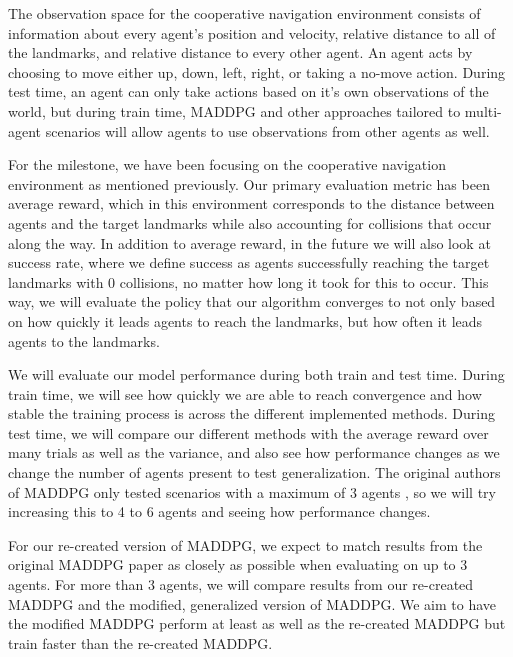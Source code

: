 \documentclass{article}
\begin{document}
The observation space for the cooperative navigation environment consists of information about every agent's position and velocity, relative distance to all of the landmarks, and relative distance to every other agent. An agent acts by choosing to move either up, down, left, right, or taking a no-move action. During test time, an agent can only take actions based on it's own observations of the world, but during train time, MADDPG and other approaches tailored to multi-agent scenarios will allow agents to use observations from other agents as well.

For the milestone, we have been focusing on the cooperative navigation environment as mentioned previously. Our primary evaluation metric has been average reward, which in this environment corresponds to the distance between agents and the target landmarks while also accounting for collisions that occur along the way. In addition to average reward, in the future we will also look at success rate, where we define success as agents successfully reaching the target landmarks with 0 collisions, no matter how long it took for this to occur. This way, we will evaluate the policy that our algorithm converges to not only based on how quickly it leads agents to reach the landmarks, but how often it leads agents to the landmarks.

We will evaluate our model performance during both train and test time. During train time, we will see how quickly we are able to reach convergence and how stable the training process is across the different implemented methods. During test time, we will compare our different methods with the average reward over many trials as well as the variance, and also see how performance changes as we change the number of agents present to test generalization. The original authors of MADDPG only tested scenarios with a maximum of 3 agents , so we will try increasing this to 4 to 6 agents and seeing how performance changes.

For our re-created version of MADDPG, we expect to match results from the original MADDPG paper as closely as possible when evaluating on up to 3 agents. For more than 3 agents, we will compare results from our re-created MADDPG and the modified, generalized version of MADDPG. We aim to have the modified MADDPG perform at least as well as the re-created MADDPG but train faster than the re-created MADDPG.
\end{document}
